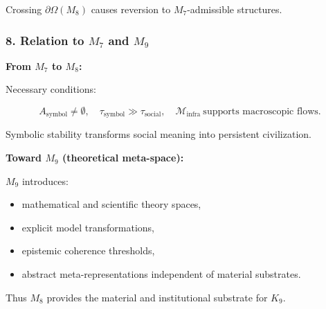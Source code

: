 Crossing $\partial\Omega(M_8)$ causes reversion to $M_7$-admissible structures.

\subsubsection*{8. Relation to \texorpdfstring{$M_7$}{M_7} and \texorpdfstring{$M_9$}{M_9}}

\textbf{From $M_7$ to $M_8$:}

Necessary conditions:

\[
A_{\mathrm{symbol}} \neq \emptyset, 
\quad 
\tau_{\mathrm{symbol}} \gg \tau_{\mathrm{social}},
\quad
\mathcal{M}_{\mathrm{infra}}\ \text{supports macroscopic flows}.
\]

Symbolic stability transforms social meaning into persistent civilization.

\textbf{Toward $M_9$ (theoretical meta-space):}

$M_9$ introduces:

\begin{itemize}
    \item mathematical and scientific theory spaces,
    \item explicit model transformations,
    \item epistemic coherence thresholds,
    \item abstract meta-representations independent of material substrates.
\end{itemize}

Thus $M_8$ provides the material and institutional substrate for $K_9$.
